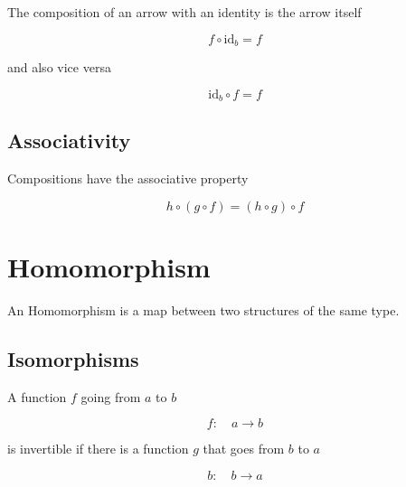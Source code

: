 \documentclass{article}
\begin{document}
The composition of an arrow with an identity is the arrow itself

\begin{center}
\end{center}

\[
    f \circ \text{id}_b = f
\]

and also vice versa

\[
    \text{id}_b \circ f = f
\]

\subsection{Associativity}

Compositions have the associative property

\begin{center}
\end{center}

\[
    h \circ (g \circ f) = (h \circ g) \circ f
\]

\pagebreak

\section{Homomorphism}

An Homomorphism is a map between two structures of the same type.

\subsection{Isomorphisms}

A function \(f\) going from \(a\) to \(b\)

\[
    f:\quad a \rightarrow b
\]

is invertible if there is a function \(g\) that goes from \(b\) to \(a\)

\[
    b:\quad b \rightarrow a
\]
\end{document}
